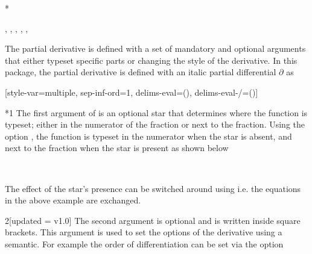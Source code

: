 	\begin{function}*{\pdv}
		\begin{syntax}
			\sarg, , , \targ{/}, , 
		\end{syntax}
		The partial derivative  is defined with a set of mandatory and optional arguments that either typeset specific parts or changing the style of the derivative. In this package, the partial derivative is defined with an italic partial differential $\partial$ as
		
		\begin{definition}
			\DeclareDerivative{\pdv}{\partial}[style-var=multiple, sep-inf-ord=1,
			delims-eval=(), delims-eval-/=()]
		\end{definition}
		
		\begin{argument}*{1}
			The first argument of  is an optional star that determines where the function is typeset; either in the numerator of the fraction or next to the fraction. Using the option , the function is typeset in the numerator when the star is absent, and next to the fraction when the star is present as shown below
			
			\begin{example}
				 \\
			\end{example}
			
			\noindent The effect of the star's presence can be switched around using  i.e. the equations in the above example are exchanged.
		\end{argument}
		
		\begin{argument}{2}[updated = v1.0]
			The second argument is optional and is written inside square brackets. This argument is used to set the options of the derivative using a  semantic. For example the order of differentiation can be set via the \key[cat=misc]{order} option
			
			\begin{example}
				\pdv[order={2,3}]{f}{x,y} \\
				\pdv[order={\beta,a,n+2a}]{f}{x,y,z} \\
				\pdv[order={2,n^2,n^2-1}]{f}{x,y,z} \\
				\pdv[order={2,n^2}]{f}{x,y,z}
			\end{example}
			

\end{argument}
\end{function}
